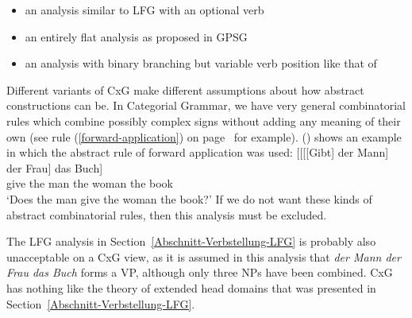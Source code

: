 \begin{itemize}
\item an analysis similar to LFG with an optional verb
\item an entirely flat analysis as proposed in GPSG
\item an analysis with binary branching but variable verb position like that of \citet[]{Steedman2000a-u}
\end{itemize}
%
Different variants of CxG make different assumptions about how abstract constructions can be.
In Categorial Grammar, we have very general combinatorial rules which combine possibly complex signs without adding any meaning
of their own (see rule (\ref{forward-application}) on page~\pageref{forward-application} for
example). () shows an example in which the abstract rule of forward application was used:
\ea
\gll {}[[[[Gibt] der Mann] der Frau] das Buch]\\
	 {}\spacebr{}\spacebr{}\spacebr{}\spacebr{}give the man the woman the book\\
\glt `Does the man give the woman the book?'
\z
If we do not want these kinds of abstract combinatorial rules, then this analysis must be excluded.

The LFG analysis in Section~\ref{Abschnitt-Verbstellung-LFG} is probably also unacceptable on a CxG view, as it is assumed in this analysis
that \emph{der Mann der Frau das Buch} forms a VP, although only three NPs have been combined. CxG
has nothing like the theory of extended head domains that was presented in Section~\ref{Abschnitt-Verbstellung-LFG}.

